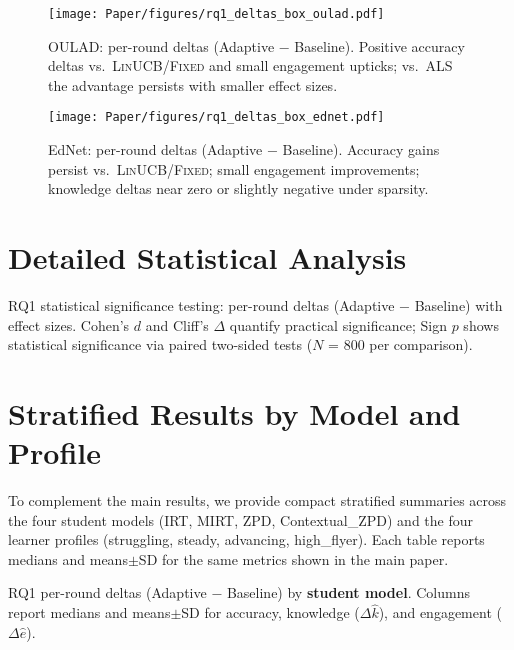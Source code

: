 \begin{figure}[!t]
  \centering
  \texttt{[image: Paper/figures/rq1\_deltas\_box\_oulad.pdf]}
  \caption{OULAD: per-round deltas (Adaptive $-$ Baseline). Positive accuracy deltas vs.\ \textsc{LinUCB}/\textsc{Fixed} and small engagement upticks; vs.\ \textsc{ALS} the advantage persists with smaller effect sizes.}
  \label{fig:rq1-deltas-oulad-app}
\end{figure}

\begin{figure}[!t]
  \centering
  \texttt{[image: Paper/figures/rq1\_deltas\_box\_ednet.pdf]}
  \caption{EdNet: per-round deltas (Adaptive $-$ Baseline). Accuracy gains persist vs.\ \textsc{LinUCB}/\textsc{Fixed}; small engagement improvements; knowledge deltas near zero or slightly negative under sparsity.}
  \label{fig:rq1-deltas-ednet-app}
\end{figure}

\section{Detailed Statistical Analysis}
\label{app:detailed-stats}

\begin{table*}[h]
  \centering
  \small
  \caption{RQ1 statistical significance testing: per-round deltas (Adaptive $-$ Baseline) with effect sizes. Cohen's $d$ and Cliff's $\Delta$ quantify practical significance; Sign $p$ shows statistical significance via paired two-sided tests ($N$ = 800 per comparison).}
  \label{tab:rq1-significance-detailed}
\end{table*}

\section{Stratified Results by Model and Profile}
\label{app:stratified}
To complement the main results, we provide compact stratified summaries across the four student models (IRT, MIRT, ZPD, Contextual\_ZPD) and the four learner profiles (struggling, steady, advancing, high\_flyer). Each table reports medians and means$\pm$SD for the same metrics shown in the main paper.

\begin{table*}[h]
	\centering
	\small
	\caption{RQ1 per-round deltas (Adaptive $-$ Baseline) by \textbf{student model}. Columns report medians and means$\pm$SD for accuracy, knowledge ($\Delta\widehat{k}$), and engagement ($\Delta\widehat{e}$).}
\end{table*}

